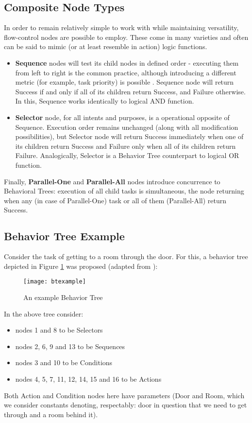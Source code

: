 \subsection{Composite Node Types}
In order to remain relatively simple to work with while maintaining versatility, flow-control nodes are possible to employ. These come in many varieties and often can be said to mimic (or at least resemble in action) logic functions.
\begin{itemize}
    \item \textbf{Sequence} nodes will test its child nodes in defined order -  executing them from left to right is the common practice, although introducing a different metric (for example, task priority) is possible \cite{btfornextgenai}. Sequence node will return Success if and only if all of its children return Success, and Failure otherwise. In this, Sequence works identically to logical AND function.
    \item \textbf{Selector} node, for all intents and purposes, is a operational opposite of Sequence. Execution order remains unchanged (along with all modification possibilities), but Selector node will return Success immediately when one of its children return Success and Failure only when all of its children return Failure. Analogically, Selector is a Behavior Tree counterpart to logical OR function.
\end{itemize}
Finally, \textbf{Parallel-One} and \textbf{Parallel-All} nodes introduce concurrence to Behavioral Trees: execution of all child tasks is simultaneous, the node returning when any (in case of Parallel-One) task or all of them (Parallel-All) return Success.

\subsection{Behavior Tree Example}
Consider the task of getting to a room through the door. For this, a behavior tree depicted in Figure \ref{fig:x btexample} was proposed (adapted from \cite{ksheperthesis}):
\begin{figure}[h]
    \centering
    \texttt{[image: btexample]}
    \caption{An example Behavior Tree}
    \label{fig:x btexample}
\end{figure}
\newpage
In the above tree consider:
\begin{itemize}
    \item nodes 1 and 8 to be Selectors
    \item nodes 2, 6, 9 and 13 to be Sequences
    \item nodes 3 and 10 to be Conditions
    \item nodes 4, 5, 7, 11, 12, 14, 15 and 16 to be Actions
\end{itemize}
Both Action and Condition nodes here have parameters (Door and Room, which we consider constants denoting, respectably: door in question that we need to get through and a room behind it).

